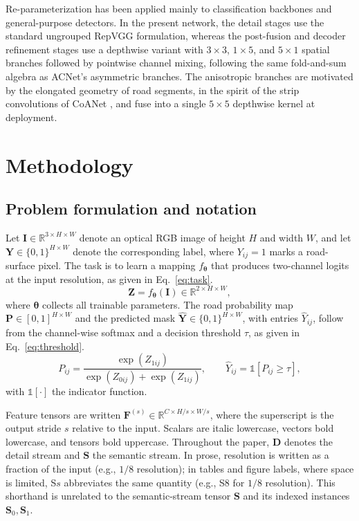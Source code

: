 \documentclass[a4paper,fleqn, review]{cas-sc}
\begin{document}
Re-parameterization has been applied mainly to classification backbones
\cite{ding2019acnet, ding2021repvgg} and
general-purpose detectors. In the present network, the detail stages use the
standard ungrouped RepVGG formulation, whereas the post-fusion and decoder
refinement stages use a depthwise variant with $3\times3$, $1\times5$, and
$5\times1$ spatial branches followed by pointwise channel mixing, following
the same fold-and-sum algebra as ACNet's asymmetric branches. The
anisotropic branches are motivated by the elongated geometry of road
segments, in the spirit of the strip convolutions of CoANet
\cite{mei2021coanet}, and fuse into a single $5\times5$ depthwise kernel at
deployment.

\section{Methodology}
\label{sec:methods}

\subsection{Problem formulation and notation}
\label{subsec:formulation}

Let $\mathbf{I} \in \mathbb{R}^{3 \times H \times W}$ denote an optical RGB image
of height $H$ and width $W$, and let
$\mathbf{Y} \in \{0,1\}^{H \times W}$ denote the corresponding label, where
$Y_{ij} = 1$ marks a road-surface pixel. The task is to learn a mapping
$f_{\boldsymbol{\theta}}$ that produces two-channel logits at the input
resolution, as given in Eq.~\eqref{eq:task}.
%
\begin{equation}
\label{eq:task}
\mathbf{Z} = f_{\boldsymbol{\theta}}(\mathbf{I}) \in
\mathbb{R}^{2 \times H \times W},
\end{equation}
%
where $\boldsymbol{\theta}$ collects all trainable parameters. The road
probability map $\mathbf{P} \in [0,1]^{H \times W}$ and the predicted mask
$\hat{\mathbf{Y}} \in \{0,1\}^{H \times W}$, with entries $\hat{Y}_{ij}$,
follow from the channel-wise softmax and a decision threshold $\tau$, as
given in Eq.~\eqref{eq:threshold}.
\begin{equation}
\label{eq:threshold}
P_{ij} = \frac{\exp(Z_{1ij})}{\exp(Z_{0ij}) + \exp(Z_{1ij})},
\qquad
\hat{Y}_{ij} = \mathbb{1}\!\left[P_{ij} \ge \tau\right],
\end{equation}
%
with $\mathbb{1}[\cdot]$ the indicator function.

Feature tensors are written $\mathbf{F}^{(s)}
\in \mathbb{R}^{C \times H/s \times W/s}$, where the superscript is the output
stride $s$ relative to the input. Scalars are italic lowercase, vectors bold
lowercase, and tensors bold uppercase. Throughout the paper, $\mathbf{D}$ denotes
the detail stream and $\mathbf{S}$ the semantic stream. In prose, resolution
is written as a fraction of the input (e.g., $1/8$ resolution); in tables
and figure labels, where space is limited, S$s$ abbreviates the same
quantity (e.g., S8 for $1/8$ resolution). This shorthand is unrelated to the
semantic-stream tensor $\mathbf{S}$ and its indexed instances
$\mathbf{S}_0,\mathbf{S}_1$.
\end{document}
